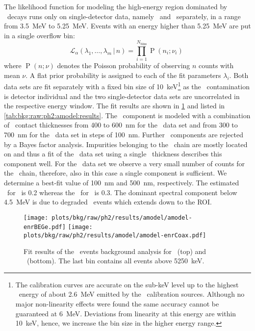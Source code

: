 The likelihood function for modeling the high-energy region dominated by \a\ decays runs
only on single-detector data, namely \enrBEGeII\ and \enrCoaxII\ separately, in a range
from 3.5~MeV to 5.25~MeV. Events with an energy higher than 5.25~MeV are put in a single
overflow bin:
\begin{equation}
  \mathcal{L}_{\alpha}{(\lambda_1,\ldots,\lambda_m\,|\,n)} =
  \prod_{i=1}^{N_\text{bins}} \operatorname{P}(n_{i};\nu_{i})\;
  \label{eq:bkg:raw:ph2:amodel:likelihood}
\end{equation}
where $\operatorname{P}(n;\nu)$ denotes the Poisson probability of observing $n$ counts
with mean $\nu$. A flat prior probability is assigned to each of the fit parameters
$\lambda_i$. Both data sets are fit separately with a fixed bin size of
10~keV\footnote{%
  The calibration curves are accurate on the sub-keV level up to the highest \g\ energy of
  about 2.6~MeV emitted by the \Th\ calibration sources. Although no major non-linearity
  effects were found the same accuracy cannot be guaranteed at 6~MeV.  Deviations from
  linearity at this energy are within 10~keV, hence, we increase the bin size in the
  higher energy range.
} as the \a\ contamination is detector individual and the
two single-detector data sets are uncorrelated in the respective energy window.
\newpar
The fit results are shown in \cref{fig:bkg:raw:ph2:amodel:resultsplot} and listed in
\cref{tab:bkg:raw:ph2:amodel:results}. The \Po\ component is modeled with a combination of
\pplus\ contact thicknesses from 400 to 600~nm for the \enrBEGeII\ data set and from 300
to 700~nm for the \enrCoaxII\ data set in steps of 100~nm. Further \Po\ components are
rejected by a Bayes factor analysis.  Impurities belonging to the \Ra\ chain are mostly
located on  and thus a fit of the \enrCoaxII\ data set using a single \pplus\
thickness describes this component well. For the \enrBEGeII\ data set we observe a very
small number of counts for the \Ra\ chain, therefore, also in this case a single component
is sufficient. We determine a best-fit value of 100~nm and 500~nm, respectively. The
estimated \pvalue\ for \enrBEGeII\ is 0.2 whereas the \pvalue\ for \enrCoaxII\ is 0.3. The
dominant spectral component below 4.5~MeV is due to degraded \a\ events which extends down
to the ROI.

\begin{figure}
  \centering
  \texttt{[image: plots/bkg/raw/ph2/results/amodel/amodel-enrBEGe.pdf]}
  \texttt{[image: plots/bkg/raw/ph2/results/amodel/amodel-enrCoax.pdf]}
  \caption{%
    Fit results of the \a\ events background analysis for \enrBEGeII\
    (top) and \enrCoaxII\ (bottom). The last bin contains all events above
    5250~keV.
  }\label{fig:bkg:raw:ph2:amodel:resultsplot}
\end{figure}

